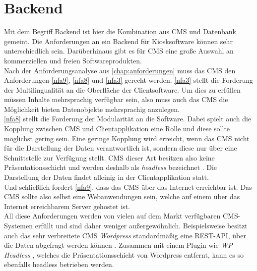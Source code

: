 \section{Backend}
\label{sec:backend}

Mit dem Begriff Backend ist hier die Kombination aus CMS und Datenbank gemeint. Die 
Anforderungen an ein Backend für Kiosksoftware können sehr unterschiedlich sein. Darüberhinaus
gibt es für CMS eine große Auswahl an kommerziellen und freien Softwareprodukten.\\
Nach der Anforderungsanalyse aus \autoref{chap:anforderungen} muss das CMS den Anforderungen
\ref{nfa9}, \ref{nfa8} und \ref{nfa3} gerecht werden. 
\ref{nfa3} stellt die Forderung der Multilingualität an die Oberfläche der Clientsoftware. 
Um dies zu erfüllen müssen Inhalte mehrsprachig verfügbar sein, also muss auch 
das CMS die Möglichkeit bieten Datenobjekte mehrsprachig anzulegen.\\
\ref{nfa8} stellt die Forderung der Modularität an die Software. 
Dabei spielt auch die Kopplung zwischen CMS und 
Clientapplikation eine Rolle und diese sollte möglichst gering sein. Eine geringe Kopplung
wird erreicht, wenn das CMS nicht für die Darstellung der Daten verantwortlich ist, sondern 
diese nur über eine Schnittstelle zur Verfügung stellt. CMS dieser Art besitzen also 
keine Präsentationsschicht und werden deshalb als \emph{headless} bezeichnet \cite{headless-market}.
Die Darstellung der Daten findet alleinig in der Clientapplikation statt.\\
Und schließlich fordert \ref{nfa9}, dass das CMS über das Internet erreichbar ist. 
Das CMS sollte also selbst eine Webanwendungen sein, welche auf einem über das Internet erreichbarem Server
gehostet ist.\\
All diese Anforderungen werden von vielen auf dem Markt verfügbaren CMS-Systemen erfüllt
und sind daher weniger außergewöhnlich. Beispielsweise besitzt auch das sehr verbreitete CMS \emph{Wordpress} 
standardmäßig eine REST-API, über die Daten abgefragt werden können \cite{wordpress}. Zusammen mit einem 
Plugin wie \emph{WP Headless} \cite{wordpress-headless}, welches die Präsentationsschicht von Wordpress
entfernt, kann es so ebenfalls headless betrieben werden.\\



